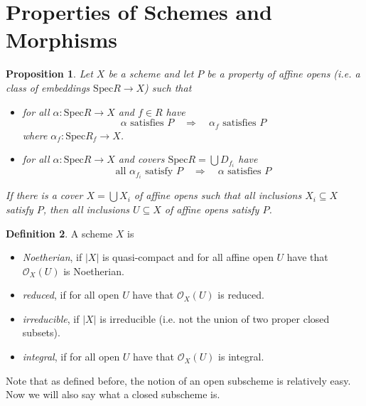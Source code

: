 \documentclass{scrartcl}
\newcommand{\Spec}{\mathrm{Spec}}
\renewcommand{\O}{\mathcal{O}}
\newtheorem{prop}{Proposition}[section]
\theoremstyle{definition}
\newtheorem{definition}[prop]{Definition}
\begin{document}
\section{Properties of Schemes and Morphisms}

\begin{prop}
    Let $X$ be a scheme and let $P$ be a property of affine opens (i.e. a class of embeddings $\Spec R \to X$) such that
    \begin{itemize}
        \item for all $\alpha: \Spec R \to X$ and $f \in R$ have
        \begin{equation*}
           \text{$\alpha$ satisfies $P$} \quad \Rightarrow \quad \text{$\alpha_f$ satisfies $P$}
        \end{equation*}
        where $\alpha_f: \Spec R_f \to X$.
        \item for all $\alpha: \Spec R \to X$ and covers $\Spec R = \bigcup D_{f_i}$ have
        \begin{equation*}
            \text{all $\alpha_{f_i}$ satisfy $P$} \quad \Rightarrow \quad \text{$\alpha$ satisfies $P$}
        \end{equation*}
    \end{itemize}
    If there is a cover $X = \bigcup X_i$ of affine opens such that all inclusions $X_i \subseteq X$ satisfy $P$, then all inclusions $U \subseteq X$ of affine opens satisfy $P$.
\end{prop}

\begin{definition}
    A scheme $X$ is
    \begin{itemize}
        \item \emph{Noetherian}, if $|X|$ is quasi-compact and for all affine open $U$ have that $\O_X(U)$ is Noetherian.
        \item \emph{reduced}, if for all open $U$ have that $\O_X(U)$ is reduced.
        \item \emph{irreducible}, if $|X|$ is irreducible (i.e. not the union of two proper closed subsets).
        \item \emph{integral}, if for all open $U$ have that $\O_X(U)$ is integral.
    \end{itemize}
\end{definition}

Note that as defined before, the notion of an open subscheme is relatively easy.
Now we will also say what a closed subscheme is.
\end{document}
